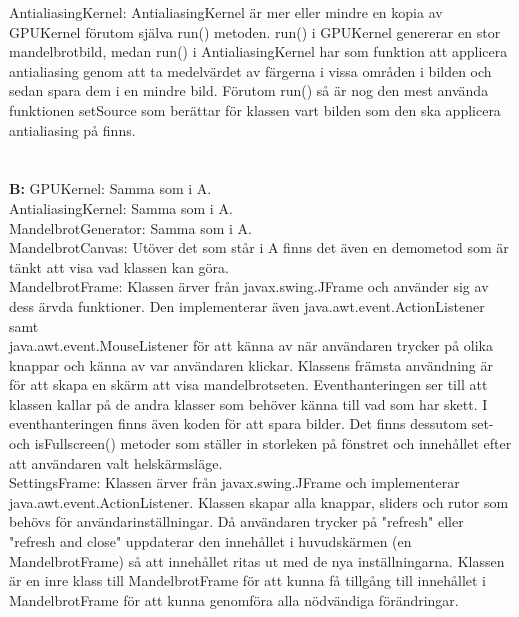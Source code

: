 \documentclass[11pt]{article} %
\begin{document}
AntialiasingKernel: AntialiasingKernel är mer eller mindre en kopia av GPUKernel förutom själva run() metoden. run() i GPUKernel genererar en stor mandelbrotbild, medan run() i AntialiasingKernel har som funktion att applicera antialiasing genom att ta medelvärdet av färgerna i vissa områden i bilden och sedan spara dem i en mindre bild. Förutom run() så är nog den mest använda funktionen setSource som berättar för klassen vart bilden som den ska applicera antialiasing på finns. \\
\\
\\
{\bf B:} 
\noindent GPUKernel: Samma som i A.\\

\noindent AntialiasingKernel: Samma som i A.\\

\noindent MandelbrotGenerator: Samma som i A. \\

\noindent MandelbrotCanvas: Utöver det som står i A finns det även en demometod som är tänkt att visa vad klassen kan göra.\\

MandelbrotFrame: Klassen ärver från javax.swing.JFrame och använder sig av dess ärvda funktioner. Den implementerar även java.awt.event.ActionListener samt \\java.awt.event.MouseListener för att känna av när användaren trycker på olika knappar och känna av var användaren klickar. Klassens främsta användning är för att skapa en skärm att visa mandelbrotseten. Eventhanteringen ser till att klassen kallar på de andra klasser som behöver känna till vad som har skett. I eventhanteringen finns även koden för att spara bilder. Det finns dessutom set- och isFullscreen() metoder som ställer in storleken på fönstret och innehållet efter att användaren valt helskärmsläge.\\

SettingsFrame: Klassen ärver från javax.swing.JFrame och implementerar \\java.awt.event.ActionListener. Klassen skapar alla knappar, sliders och rutor som behövs för användarinställningar. Då användaren trycker på "refresh" eller "refresh and close" uppdaterar den innehållet i huvudskärmen (en MandelbrotFrame) så att innehållet ritas ut med de nya inställningarna. Klassen är en inre klass till MandelbrotFrame för att kunna få tillgång till innehållet i MandelbrotFrame för att kunna genomföra alla nödvändiga förändringar.\\
\end{document}
